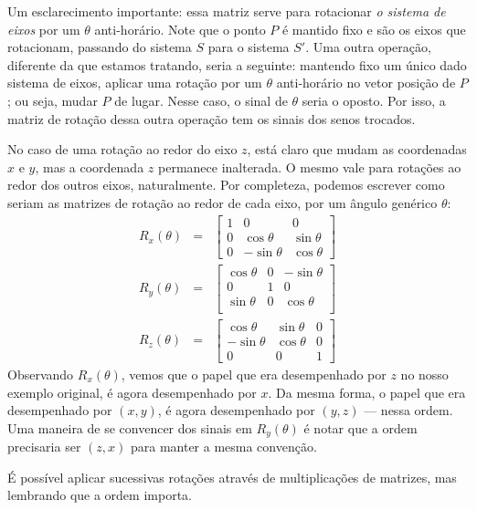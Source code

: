 Um esclarecimento importante: essa matriz serve para rotacionar \textit{o sistema de eixos} por um $\theta$ anti-horário. Note que o ponto $P$ é mantido fixo e são os eixos que rotacionam, passando do sistema $S$ para o sistema $S'$. Uma outra operação, diferente da que estamos tratando, seria a seguinte: mantendo fixo um único dado sistema de eixos, aplicar uma rotação por um $\theta$ anti-horário no vetor posição de $P$; ou seja, mudar $P$ de lugar. Nesse caso, o sinal de $\theta$ seria o oposto. Por isso, a matriz de rotação dessa outra operação tem os sinais dos senos trocados.

No caso de uma rotação ao redor do eixo $z$, está claro que mudam as coordenadas $x$ e $y$, mas a coordenada $z$ permanece inalterada. O mesmo vale para rotações ao redor dos outros eixos, naturalmente. Por completeza, podemos escrever como seriam as matrizes de rotação ao redor de cada eixo, por um ângulo genérico $\theta$:
%
\begin{eqnarray}
R_x(\theta) &=&
\begin{bmatrix}
1 & 0 & 0 \\
0 & \cos \theta & \sin \theta \\
0 & -\sin \theta & \cos \theta
\end{bmatrix} \\[1em]
R_y(\theta) &=&
\begin{bmatrix}
\cos \theta & 0 & -\sin \theta \\
0 & 1 & 0 \\
\sin \theta & 0 & \cos \theta \\ 
\end{bmatrix} \\[1em]
R_z(\theta) &=&
\begin{bmatrix}
\cos \theta & \sin \theta & 0 \\
-\sin \theta & \cos \theta & 0 \\ 
0 & 0 & 1 
\end{bmatrix}
\end{eqnarray}
%
Observando $R_x(\theta)$, vemos que o papel que era desempenhado por $z$ no nosso exemplo original, é agora desempenhado por $x$. Da mesma forma, o papel que era desempenhado por $(x,y)$, é agora desempenhado por $(y,z)$ --- nessa ordem. Uma maneira de se convencer dos sinais em $R_y(\theta)$ é notar que a ordem precisaria ser $(z,x)$ para manter a mesma convenção. 

É possível aplicar sucessivas rotações através de multiplicações de matrizes, mas lembrando que a ordem importa.

